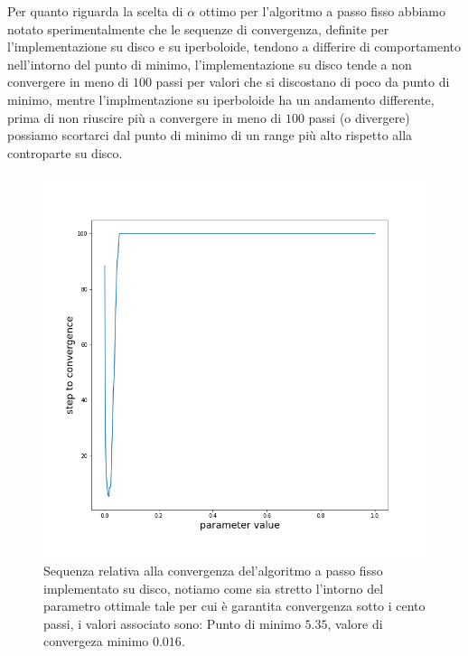 \documentclass[a4paper, 12pt]{article}
\begin{document}
Per quanto riguarda la scelta di $\alpha$ ottimo per l'algoritmo a passo fisso abbiamo notato sperimentalmente che le sequenze di convergenza, definite per l'implementazione su disco e su iperboloide, tendono a differire di comportamento nell'intorno del punto di minimo, l'implementazione su disco tende a non convergere in meno di $100$ passi per valori che si discostano di poco da punto di minimo, mentre l'implmentazione su iperboloide ha un andamento differente, prima di non riuscire più a convergere in meno di $100$ passi (o divergere) possiamo scortarci dal punto di minimo di un range più alto rispetto alla controparte su disco.\\
\begin{figure}[H] %
    \centering\includegraphics[width=1\textwidth]{fixed_step_parameter_poincare.png}
    \caption{Sequenza relativa alla convergenza del'algoritmo a passo fisso implementato su disco, notiamo come sia stretto l'intorno del parametro ottimale tale per cui è garantita convergenza sotto i cento passi, i valori associato sono: Punto di minimo $5.35$, valore di convergeza minimo $0.016$.}
\end{figure}
\end{document}
